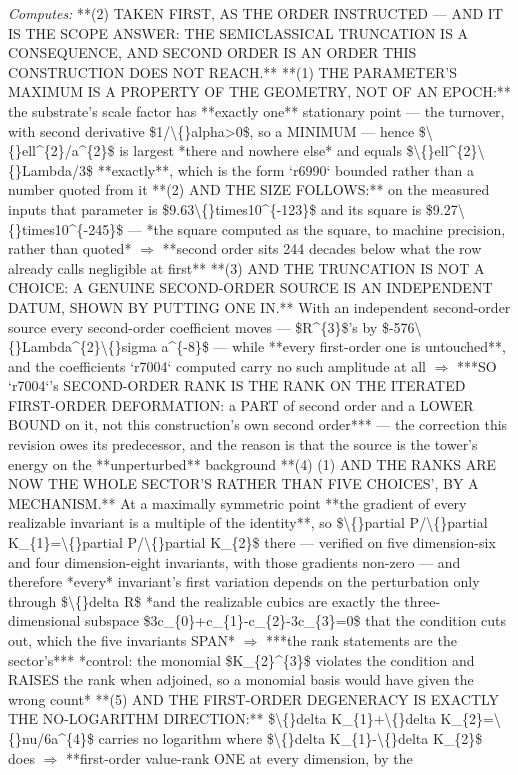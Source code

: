 \begin{description}
\emph{Computes:} **(2) TAKEN FIRST, AS THE ORDER INSTRUCTED --- AND IT IS THE SCOPE ANSWER: THE SEMICLASSICAL TRUNCATION IS A CONSEQUENCE, AND SECOND ORDER IS AN ORDER THIS CONSTRUCTION DOES NOT REACH.**  **(1) THE PARAMETER'S MAXIMUM IS A PROPERTY OF THE GEOMETRY, NOT OF AN EPOCH:** the substrate's scale factor has **exactly one** stationary point --- the turnover, with second derivative \$1/\textbackslash\{\}alpha>0\$, so a MINIMUM --- hence \$\textbackslash\{\}ell\textasciicircum{}\{2\}/a\textasciicircum{}\{2\}\$ is largest *there and nowhere else* and equals \$\textbackslash\{\}ell\textasciicircum{}\{2\}\textbackslash\{\}Lambda/3\$ **exactly**, which is the form `r6990` bounded rather than a number quoted from it  **(2) AND THE SIZE FOLLOWS:** on the measured inputs that parameter is \$9.63\textbackslash\{\}times10\textasciicircum{}\{-123\}\$ and its square is \$9.27\textbackslash\{\}times10\textasciicircum{}\{-245\}\$ --- *the square computed as the square, to machine precision, rather than quoted* \ensuremath{\Rightarrow} **second order sits 244 decades below what the row already calls negligible at first**  **(3)  AND THE TRUNCATION IS NOT A CHOICE: A GENUINE SECOND-ORDER SOURCE IS AN INDEPENDENT DATUM, SHOWN BY PUTTING ONE IN.** With an independent second-order source every second-order coefficient moves --- \$R\textasciicircum{}\{3\}\$'s by \$-576\textbackslash\{\}Lambda\textasciicircum{}\{2\}\textbackslash\{\}sigma a\textasciicircum{}\{-8\}\$ --- while **every first-order one is untouched**, and the coefficients `r7004` computed carry no such amplitude at all \ensuremath{\Rightarrow} ***SO `r7004`'s SECOND-ORDER RANK IS THE RANK ON THE ITERATED FIRST-ORDER DEFORMATION: a PART of second order and a LOWER BOUND on it, not this construction's own second order*** --- the correction this revision owes its predecessor, and the reason is that the source is the tower's energy on the **unperturbed** background  **(4)  (1) AND THE RANKS ARE NOW THE WHOLE SECTOR'S RATHER THAN FIVE CHOICES', BY A MECHANISM.** At a maximally symmetric point **the gradient of every realizable invariant is a multiple of the identity**, so \$\textbackslash\{\}partial P/\textbackslash\{\}partial K\_\{1\}=\textbackslash\{\}partial P/\textbackslash\{\}partial K\_\{2\}\$ there --- verified on five dimension-six and four dimension-eight invariants, with those gradients non-zero --- and therefore *every* invariant's first variation depends on the perturbation only through \$\textbackslash\{\}delta R\$  *and the realizable cubics are exactly the three-dimensional subspace \$3c\_\{0\}+c\_\{1\}-c\_\{2\}-3c\_\{3\}=0\$ that the condition cuts out, which the five invariants SPAN* \ensuremath{\Rightarrow} ***the rank statements are the sector's***  *control: the monomial \$K\_\{2\}\textasciicircum{}\{3\}\$ violates the condition and RAISES the rank when adjoined, so a monomial basis would have given the wrong count*  **(5) AND THE FIRST-ORDER DEGENERACY IS EXACTLY THE NO-LOGARITHM DIRECTION:** \$\textbackslash\{\}delta K\_\{1\}+\textbackslash\{\}delta K\_\{2\}=\textbackslash\{\}nu/6a\textasciicircum{}\{4\}\$ carries no logarithm where \$\textbackslash\{\}delta K\_\{1\}-\textbackslash\{\}delta K\_\{2\}\$ does \ensuremath{\Rightarrow} **first-order value-rank ONE at every dimension, by the 
\end{description}
